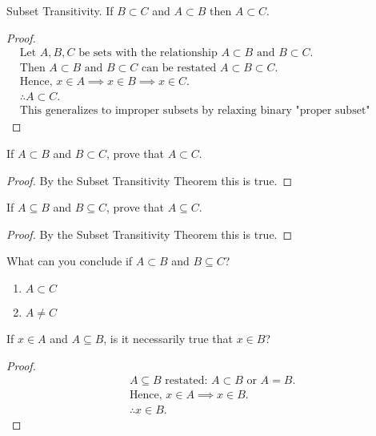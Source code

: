 \begin{question}

  \begin{theorem}
    Subset Transitivity.
    If $B \subset C$ and $A \subset B$ then $A \subset C$.
    \begin{proof}
      \begin{align*}
        & \text{Let } A, B, C \text{ be sets with the relationship } A \subset B \text{ and } B \subset C. \\
        & \text{Then } A \subset B \text{ and } B \subset C \text{ can be restated } A \subset B \subset C. \\
        & \text{Hence, } x \in A \implies x \in B \implies x \in C. \\
        & \therefore A \subset C. \\
        & \text{This generalizes to improper subsets by relaxing binary "proper subset" relation to allow equivalence.}
      \end{align*}
    \end{proof}
  \end{theorem} 

  \begin{subquestion}
    If $ A \subset B$ and $B \subset C$, prove that $A \subset C$.
  \end{subquestion}
  \begin{proof}
    By the Subset Transitivity Theorem this is true.
  \end{proof}

  \begin{subquestion}
    If $A \subseteq B$ and $B \subseteq C$, prove that $A \subseteq C$.
  \end{subquestion}
  \begin{proof}
    By the Subset Transitivity Theorem this is true.
  \end{proof}

  \begin{subquestion}
    What can you conclude if $A \subset B$ and $B \subseteq C$?
  \end{subquestion}
  \begin{enumerate}
    \item $A \subset C$
    \item $A \neq C$
  \end{enumerate}

  \begin{subquestion}
    If $x \in A$ and $A \subseteq B$, is it necessarily true that $x \in B$?
  \end{subquestion}
  \begin{proof}
    \begin{align*}
      & A \subseteq B \text{ restated: } A \subset B \text{ or } A = B. \\
      & \text{Hence, } x \in A \implies x \in B. \\
      & \therefore x \in B.
    \end{align*}
  \end{proof}


\end{question}
